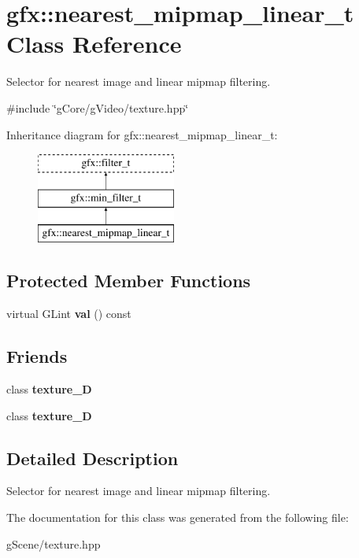 \hypertarget{classgfx_1_1nearest__mipmap__linear__t}{\section{gfx\-:\-:nearest\-\_\-mipmap\-\_\-linear\-\_\-t Class Reference}
\label{classgfx_1_1nearest__mipmap__linear__t}
}


Selector for nearest image and linear mipmap filtering.  




{\ttfamily \#include \char`\"{}g\-Core/g\-Video/texture.\-hpp\char`\"{}}

Inheritance diagram for gfx\-:\-:nearest\-\_\-mipmap\-\_\-linear\-\_\-t\-:\begin{figure}[H]
\begin{center}
\leavevmode
\includegraphics[height=3.000000cm]{classgfx_1_1nearest__mipmap__linear__t}
\end{center}
\end{figure}
\subsection*{Protected Member Functions}
\begin{DoxyCompactItemize}
\item 
\hypertarget{classgfx_1_1nearest__mipmap__linear__t_a62bfc0c869597d99ad9e18114d68875c}{virtual G\-Lint {\bfseries val} () const }\label{classgfx_1_1nearest__mipmap__linear__t_a62bfc0c869597d99ad9e18114d68875c}

\end{DoxyCompactItemize}
\subsection*{Friends}
\begin{DoxyCompactItemize}
\item 
\hypertarget{classgfx_1_1nearest__mipmap__linear__t_a2039d67f6166ccf823c78e3476aad9aa}{class {\bfseries texture\-\_\-D}}\label{classgfx_1_1nearest__mipmap__linear__t_a2039d67f6166ccf823c78e3476aad9aa}

\item 
\hypertarget{classgfx_1_1nearest__mipmap__linear__t_a22ad86ef46c3b17357a0cd59e50bc7dd}{class {\bfseries texture\-\_\-D}}\label{classgfx_1_1nearest__mipmap__linear__t_a22ad86ef46c3b17357a0cd59e50bc7dd}

\end{DoxyCompactItemize}


\subsection{Detailed Description}
Selector for nearest image and linear mipmap filtering. 

The documentation for this class was generated from the following file\-:\begin{DoxyCompactItemize}
\item 
g\-Scene/texture.\-hpp\end{DoxyCompactItemize}
